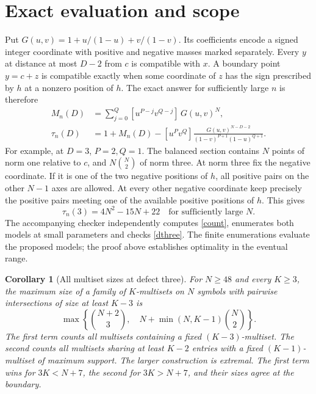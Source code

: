 \documentclass[10pt]{article}
\newtheorem{corollary}[theorem]{Corollary}
\begin{document}
\section{Exact evaluation and scope}

Put $G(u,v)=1+u/(1-u)+v/(1-v)$. Its coefficients encode a signed integer coordinate with positive and negative masses marked separately. Every $y$ at distance at most $D-2$ from $c$ is compatible with $x$. A boundary point $y=c+z$ is compatible exactly when some coordinate of $z$ has the sign prescribed by $h$ at a nonzero position of $h$. The exact answer for sufficiently large $n$ is therefore
\[
\begin{split}
 M_n(D)&=\sum_{j=0}^{Q}[u^{P-j}v^{Q-j}]\,G(u,v)^N,\\
 \tau_n(D)&=1+M_n(D)-
 [u^P v^Q]\frac{G(u,v)^{N-D-2}}{(1-v)^{P+1}(1-u)^{Q+1}} .
\end{split}
\tag{8}\label{count}
\]
For example, at $D=3$, $P=2,Q=1$. The balanced section contains $N$ points of norm one relative to $c$, and $N\binom{N}{2}$ of norm three. At norm three fix the negative coordinate. If it is one of the two negative positions of $h$, all positive pairs on the other $N-1$ axes are allowed. At every other negative coordinate keep precisely the positive pairs meeting one of the available positive positions of $h$. This gives
\[
           \tau_n(3)=4N^2-15N+22
           \quad\text{for sufficiently large }N.
\tag{9}\label{dthree}
\]
The accompanying checker independently computes \eqref{count}, enumerates both models at small parameters and checks \eqref{dthree}. The finite enumerations evaluate the proposed models; the proof above establishes optimality in the eventual range.

\begin{corollary}[All multiset sizes at defect three]\label{multi}
For $N\ge48$ and every $K\ge3$, the maximum size of a family of $K$-multisets on $N$ symbols with pairwise intersections of size at least $K-3$ is
\[
 \max\left\{\binom{N+2}3,\quad N+\min(N,K-1)\binom N2\right\}.
 \tag{B}\label{allmultis}
\]
The first term counts all multisets containing a fixed $(K-3)$-multiset. The second counts all multisets sharing at least $K-2$ entries with a fixed $(K-1)$-multiset of maximum support. The larger construction is extremal. The first term wins for $3K<N+7$, the second for $3K>N+7$, and their sizes agree at the boundary.
\end{corollary}
\end{document}
